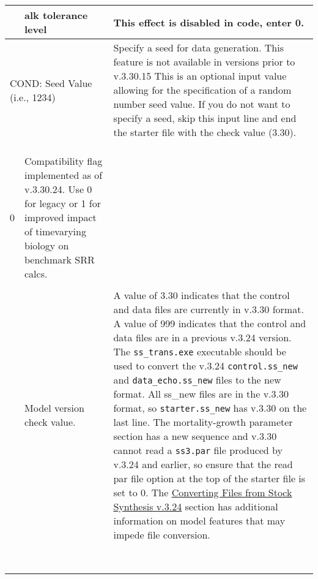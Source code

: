 {\begin{landscape}
\begin{longtable}{p{1.5cm} p{7.2cm} p{12.3cm}}
  \hline
  \raisebox{0.1\ht\strutbox}{\hypertarget{ALK}{0}} & \gls{alk} tolerance level & This effect is disabled in code, enter 0. \Tstrut\Bstrut\\

  \hline  
  \multicolumn{2}{l}{COND: Seed Value (i.e., 1234)} & \multirow{1}{12.3cm}[-0.25cm]{\parbox{12.3cm}{Specify a seed for data generation. This feature is not available in versions prior to v.3.30.15 This is an optional input value allowing for the specification of a random number seed value. If you do not want to specify a seed, skip this input line and end the starter file with the check value (3.30).}} \Tstrut\Bstrut\\
  & & \\ 
  & & \Bstrut\\
  & & \\
  
  0 & \multirow{1}{12.3cm}[-0.25cm]{\parbox{12.3cm}{Compatibility flag implemented as of v.3.30.24. Use 0 for legacy or 1 for improved impact of timevarying biology on benchmark SRR calcs.}} \Tstrut\Bstrut\\
  & & \\

 \pagebreak
 \raisebox{0.1\ht\strutbox}{\hypertarget{Convert}{3.30}} & Model version check value. & \multirow{1}{12.3cm}[-0.25cm]{\parbox{12.3cm}{A value of 3.30 indicates that the control and data files are currently in v.3.30 format. A value of 999 indicates that the control and data files are in a previous v.3.24 version. The \texttt{\texttt{ss\_trans.exe}} executable should be used to convert the v.3.24 \texttt{\texttt{control.ss\_new}} and \texttt{\texttt{data\_echo.ss\_new}} files to the new format. All ss\_new files are in the v.3.30 format, so \texttt{\texttt{starter.ss\_new}} has v.3.30 on the last line. The mortality-growth parameter section has a new sequence and v.3.30 cannot read a \texttt{\texttt{ss3.par}} file produced by v.3.24 and earlier, so ensure that the read par file option at the top of the starter file is set to 0. The \hyperlink{ConvIssues}{Converting Files from Stock Synthesis v.3.24} section has additional information on model features that may impede file conversion.}} \Tstrut\Bstrut\\
     & & \\  
     & & \\  
	   & & \\
     & & \\
   	 & & \\
     & & \\  
     & & \\  
     & & \\

\end{longtable}
\end{landscape}
}
\restoregeometry





\pagebreak
